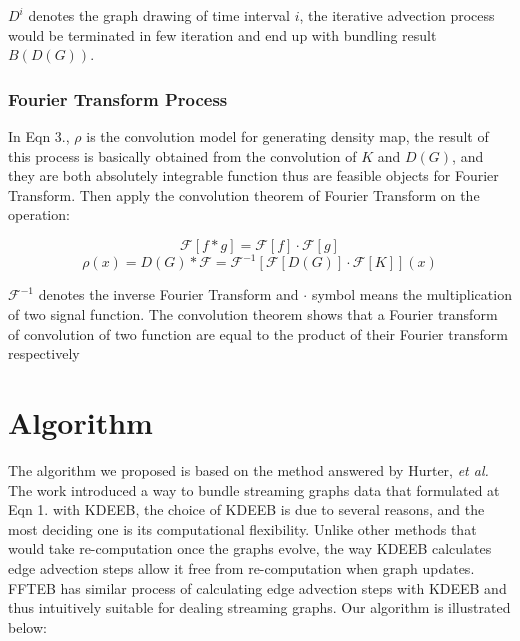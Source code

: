 \documentclass{article}
\begin{document}
$D^i$ denotes the graph drawing of time interval $i$, the iterative advection process would be terminated in few iteration and end up with bundling result $B(D(G))$.

\subsubsection{Fourier Transform Process}
In Eqn 3., $\rho$ is the convolution model for generating density map, the result of this process is basically obtained from the convolution of $K$ and $D(G)$, and they are both absolutely integrable function thus are feasible objects for Fourier Transform. Then apply the convolution theorem of Fourier Transform on the operation:


\begin{displaymath}
\mathcal{F}[f*g] = \mathcal{F}[f] \cdot \mathcal{F}[g]
\end{displaymath}
\begin{equation}
\rho(x) =  D(G)*\mathcal{F} = \mathcal{F}^{-1}[\mathcal{F}[D(G)]\cdot\mathcal{F}[K]](x)
\end{equation}

$\mathcal{F}^{-1}$ denotes the inverse Fourier Transform and $\cdot$ symbol means the multiplication of two signal function. The convolution theorem shows that a Fourier transform of convolution of two function are equal to the product of their Fourier transform respectively


\section{Algorithm}
The algorithm we proposed is based on the method answered by Hurter, \emph{et al.}\cite{Smooth} The work introduced a way to bundle streaming graphs data that formulated at Eqn 1. with KDEEB, the choice of KDEEB is due to several reasons, and the most deciding one is its computational flexibility. Unlike other methods that would take re-computation once the graphs evolve, the way KDEEB calculates edge advection steps allow it free from re-computation when graph updates. FFTEB has similar process of calculating edge advection steps with KDEEB and thus intuitively suitable for dealing streaming graphs. Our algorithm is illustrated below:
\end{document}
